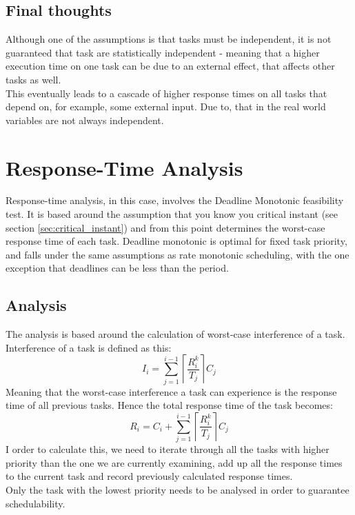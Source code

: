 \documentclass{acm_proc_article-sp}
\begin{document}
\subsection{Final thoughts}
Although one of the assumptions is that tasks must be independent, it is not guaranteed that task are statistically independent - meaning that a higher execution time on one task can be due to an external effect, that affects other tasks as well.\\
This eventually leads to a cascade of higher response times on all tasks that depend on, for example, some external input. Due to, that in the real world variables are not always independent.

\section{Response-Time Analysis}
\label{sec:rta}
Response-time analysis, in this case, involves the Deadline Monotonic feasibility test. It is based around the assumption that you know you critical instant (see section \ref{sec:critical_instant}) and from this point determines the worst-case response time of each task. Deadline monotonic is optimal for fixed task priority, and falls under the same assumptions as rate monotonic scheduling, with the one exception that deadlines can be less than the period.

\subsection{Analysis}
The analysis is based around the calculation of worst-case interference of a task. Interference of a task is defined as this:
\begin{equation}
I_{i}= \displaystyle\sum\limits_{j=1}^{i-1} \left\lceil \frac{R_{i}^{k}}{T_{j}}\right\rceil C_{j}
\end{equation}
Meaning that the worst-case interference a task can experience is the response time of all previous tasks. Hence the total response time of the task becomes:
\begin{equation}
\label{eq:response_time}
R_{i}=C_{i} + \displaystyle\sum\limits_{j=1}^{i-1} \left\lceil \frac{R_{i}^{k}}{T_{j}}\right\rceil C_{j}
\end{equation}
I order to calculate this, we need to iterate through all the tasks with higher priority than the one we are currently examining, add up all the response times to the current task and record previously calculated response times.\\
Only the task with the lowest priority needs to be analysed in order to guarantee schedulability.
\end{document}
